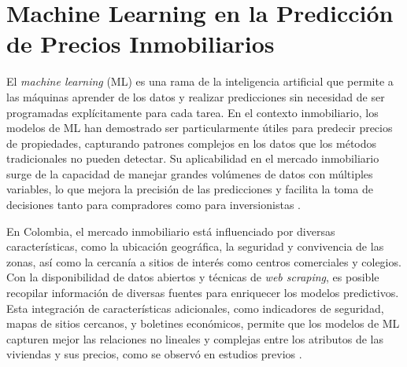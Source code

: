 




\section*{Machine Learning en la Predicción de Precios Inmobiliarios}
El \textit{machine learning} (ML) es una rama de la inteligencia artificial que permite a las máquinas aprender de los datos y realizar predicciones sin necesidad de ser programadas explícitamente para cada tarea. En el contexto inmobiliario, los modelos de ML han demostrado ser particularmente útiles para predecir precios de propiedades, capturando patrones complejos en los datos que los métodos tradicionales no pueden detectar. Su aplicabilidad en el mercado inmobiliario surge de la capacidad de manejar grandes volúmenes de datos con múltiples variables, lo que mejora la precisión de las predicciones y facilita la toma de decisiones tanto para compradores como para inversionistas \cite{kim2018machinelearning}.

En Colombia, el mercado inmobiliario está influenciado por diversas características, como la ubicación geográfica, la seguridad y convivencia de las zonas, así como la cercanía a sitios de interés como centros comerciales y colegios. Con la disponibilidad de datos abiertos y técnicas de \textit{web scraping}, es posible recopilar información de diversas fuentes para enriquecer los modelos predictivos. Esta integración de características adicionales, como indicadores de seguridad, mapas de sitios cercanos, y boletines económicos, permite que los modelos de ML capturen mejor las relaciones no lineales y complejas entre los atributos de las viviendas y sus precios, como se observó en estudios previos \cite{zhang2018realestate}.

